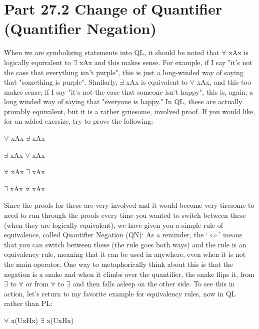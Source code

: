 \section{Part 27.2 Change of Quantifier (Quantifier Negation)}
When we are symbolizing statements into QL, it should be noted that \enot $\forall$ x\enot Ax is logically equivalent to $\exists$ xAx and this makes sense. For example, if I say "it's not the case that everything isn't purple", this is just a long-winded way of saying that "something is purple". Similarly, \enot $\exists$ x\enot Ax is equivalent to $\forall$ xAx, and this too makes sense; if I say "it's not the case that someone isn't happy", this is, again, a long winded way of saying that "everyone is happy." In QL, these are actually provably equivalent, but it is a rather gruesome, involved proof. If you would like, for an added exersize, try to prove the following:
\begin{earg}
\item[]\enot $\forall$ x\enot Ax \therefore  $\exists$ xAx
\item[]\enot $\exists$ x\enot Ax \therefore  $\forall$ xAx
\item[]$\forall$ x\enot Ax \therefore  \enot $\exists$ xAx
\item[]$\exists$ x\enot Ax \therefore  \enot $\forall$ xAx
\end{earg}
Since the proofs for these are very involved and it would become very tiresome to need to run through the proofs every time you wanted to switch between these (when they are logically equivalent), we have given you a simple rule of equivalence, called Quantifier Negation (QN):
As a reminder, the `$\Leftrightarrow$' means that you can switch between these (the rule goes both ways) and the rule is an equivalency rule, meaning that it can be used in anywhere, even when it is not the main operator. One way to metaphorically think about this is that the negation is a snake and when it climbs over the quantifier, the snake flips it, from $\exists$  to $\forall$  or from $\forall$  to $\exists$  and then falls asleep on the other side. To see this in action, let's return to my favorite example for equivalency rules, now in QL rather than PL:
\begin{center}
\enot $\forall$ x(Ux\eif \enot Hx) \therefore  $\exists$ x(Ux\eand Hx)
\end{center}
